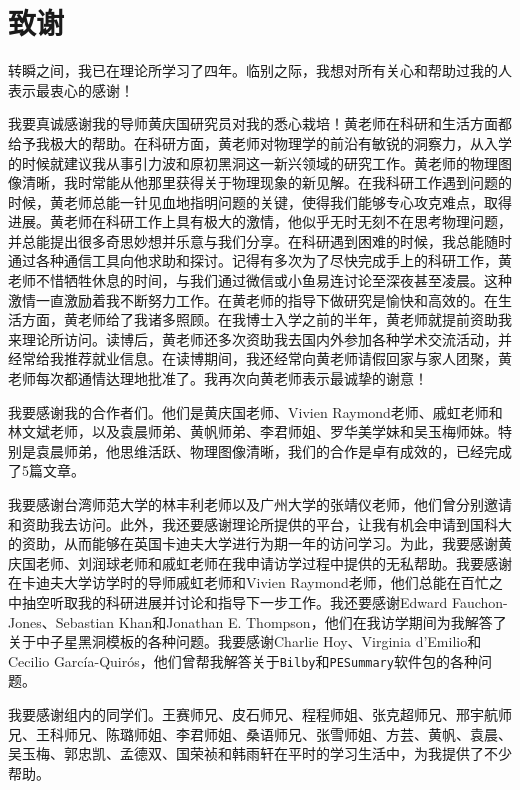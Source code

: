 \chapter[致谢]{致\quad 谢}%
转瞬之间，我已在理论所学习了四年。临别之际，我想对所有关心和帮助过我的人表示最衷心的感谢！

我要真诚感谢我的导师黄庆国研究员对我的悉心栽培！黄老师在科研和生活方面都给予我极大的帮助。在科研方面，黄老师对物理学的前沿有敏锐的洞察力，从入学的时候就建议我从事引力波和原初黑洞这一新兴领域的研究工作。黄老师的物理图像清晰，我时常能从他那里获得关于物理现象的新见解。在我科研工作遇到问题的时候，黄老师总能一针见血地指明问题的关键，使得我们能够专心攻克难点，取得进展。黄老师在科研工作上具有极大的激情，他似乎无时无刻不在思考物理问题，并总能提出很多奇思妙想并乐意与我们分享。在科研遇到困难的时候，我总能随时通过各种通信工具向他求助和探讨。记得有多次为了尽快完成手上的科研工作，黄老师不惜牺牲休息的时间，与我们通过微信或小鱼易连讨论至深夜甚至凌晨。这种激情一直激励着我不断努力工作。在黄老师的指导下做研究是愉快和高效的。在生活方面，黄老师给了我诸多照顾。在我博士入学之前的半年，黄老师就提前资助我来理论所访问。读博后，黄老师还多次资助我去国内外参加各种学术交流活动，并经常给我推荐就业信息。在读博期间，我还经常向黄老师请假回家与家人团聚，黄老师每次都通情达理地批准了。我再次向黄老师表示最诚挚的谢意！

我要感谢我的合作者们。他们是黄庆国老师、Vivien Raymond老师、戚虹老师和林文斌老师，以及袁晨师弟、黄帆师弟、李君师姐、罗华美学妹和吴玉梅师妹。特别是袁晨师弟，他思维活跃、物理图像清晰，我们的合作是卓有成效的，已经完成了5篇文章。


我要感谢台湾师范大学的林丰利老师以及广州大学的张靖仪老师，他们曾分别邀请和资助我去访问。此外，我还要感谢理论所提供的平台，让我有机会申请到国科大的资助，从而能够在英国卡迪夫大学进行为期一年的访问学习。为此，我要感谢黄庆国老师、刘润球老师和戚虹老师在我申请访学过程中提供的无私帮助。我要感谢在卡迪夫大学访学时的导师戚虹老师和Vivien Raymond老师，他们总能在百忙之中抽空听取我的科研进展并讨论和指导下一步工作。我还要感谢Edward Fauchon-Jones、Sebastian Khan和Jonathan E. Thompson，他们在我访学期间为我解答了关于中子星黑洞模板的各种问题。我要感谢Charlie Hoy、Virginia d'Emilio和Cecilio García-Quirós，他们曾帮我解答关于\texttt{Bilby}和\texttt{PESummary}软件包的各种问题。

我要感谢组内的同学们。王赛师兄、皮石师兄、程程师姐、张克超师兄、邢宇航师兄、王科师兄、陈璐师姐、李君师姐、桑语师兄、张雪师姐、方芸、黄帆、袁晨、吴玉梅、郭忠凯、孟德双、国荣祯和韩雨轩在平时的学习生活中，为我提供了不少帮助。

